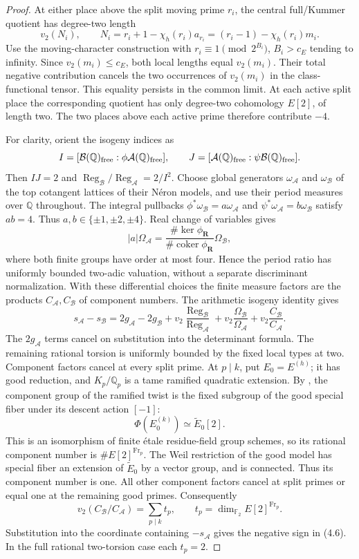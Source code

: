\documentclass[11pt]{article}
\theoremstyle{definition}
\theoremstyle{remark}
\newcommand{\Q}{\mathbb Q}
\newcommand{\F}{\mathbb F}
\begin{document}
\begin{proof}
At either place above the split moving prime $r_i$, the central
full/Kummer quotient has degree-two length
\[
 v_2(N_i),\qquad
 N_i=r_i+1-\chi_h(r_i)a_{r_i}
     =(r_i-1)-\chi_h(r_i)m_i.
\]
Use the moving-character construction with
$r_i\equiv1\pmod{2^{B_i}}$, $B_i>c_E$ tending to infinity.
Since $v_2(m_i)\le c_E$, both local lengths equal $v_2(m_i)$.
Their total negative contribution cancels the two occurrences of
$v_2(m_i)$ in the class-functional tensor. This equality persists
in the common limit. At each active split place the corresponding
quotient has only degree-two cohomology $E[2]$, of length two.
The two places above each active prime therefore contribute $-4$.

For clarity, orient the isogeny indices as
\[
 I=[\mathcal B(\Q)_{\rm free}:\phi\mathcal A(\Q)_{\rm free}],
 \qquad
 J=[\mathcal A(\Q)_{\rm free}:\psi\mathcal B(\Q)_{\rm free}].
\]
Then $IJ=2$ and
$\operatorname{Reg}_{\mathcal B}/\operatorname{Reg}_{\mathcal A}
=2/I^2$. Choose global generators $\omega_{\mathcal A}$ and
$\omega_{\mathcal B}$ of the top cotangent lattices of their
N\'eron models, and use their period measures over $\Q$ throughout.
The integral pullbacks
$\phi^*\omega_{\mathcal B}=a\omega_{\mathcal A}$ and
$\psi^*\omega_{\mathcal A}=b\omega_{\mathcal B}$ satisfy $ab=4$.
Thus $a,b\in\{\pm1,\pm2,\pm4\}$. Real change of variables gives
\[
 |a|\Omega_{\mathcal A}
 =\frac{\#\ker\phi_{\mathbf R}}{\#\operatorname{coker}\phi_{\mathbf R}}
   \Omega_{\mathcal B},
\]
where both finite groups have order at most four. Hence the period
ratio has uniformly bounded two-adic valuation, without a separate
discriminant normalization. With these differential choices the
finite measure factors are the products $C_{\mathcal A},C_{\mathcal B}$
of component numbers. The arithmetic isogeny identity gives
\[
 s_{\mathcal A}-s_{\mathcal B}
 =2g_{\mathcal A}-2g_{\mathcal B}
  +v_2\frac{\operatorname{Reg}_{\mathcal B}}{\operatorname{Reg}_{\mathcal A}}
  +v_2\frac{\Omega_{\mathcal B}}{\Omega_{\mathcal A}}
  +v_2\frac{C_{\mathcal B}}{C_{\mathcal A}}.
\]
The $2g_{\mathcal A}$ terms cancel on substitution into the
determinant formula. The remaining rational torsion is uniformly
bounded by the fixed local types at two. Component factors cancel
at every split prime. At $p\mid k$, put $E_0=E^{(h)}$; it has good reduction, and
$K_p/\Q_p$ is a tame ramified quadratic extension.
By \cite[Theorem~5.3 and Remark~5.4.1, pp.~299--300]{edixhoven},
the component group of the ramified twist is the fixed subgroup
of the good special fiber under its descent action $[-1]$:
\[
 \Phi(E_0^{(k)})\simeq\widetilde E_0[2].
\]
This is an isomorphism of finite \'etale residue-field group
schemes, so its rational component number is
$\#E[2]^{\operatorname{Fr}_p}$.
The Weil restriction of the good model has special fiber an
extension of $\widetilde E_0$ by a vector group, and is connected.
Thus its component number is one.
All other component factors cancel at split primes or equal one
at the remaining good primes. Consequently
\[
 v_2(C_{\mathcal B}/C_{\mathcal A})
   =\sum_{p\mid k}t_p,\qquad
 t_p=\dim_{\F_2}E[2]^{\operatorname{Fr}_p}.
\]
Substitution into the coordinate containing $-s_{\mathcal A}$
gives the negative sign in (4.6).
In the full rational two-torsion case each $t_p=2$.
\end{proof}
\end{document}
